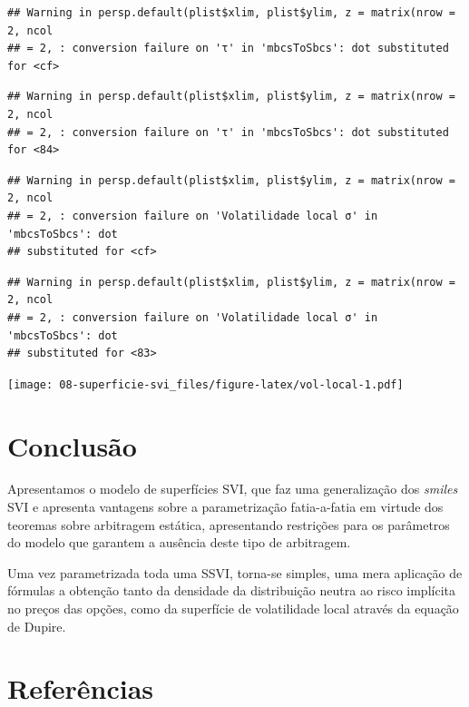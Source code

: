 \documentclass[]{book}
\theoremstyle{definition}
\theoremstyle{definition}
\theoremstyle{definition}
\theoremstyle{remark}
\begin{document}
\begin{verbatim}
## Warning in persp.default(plist$xlim, plist$ylim, z = matrix(nrow = 2, ncol
## = 2, : conversion failure on 'τ' in 'mbcsToSbcs': dot substituted for <cf>
\end{verbatim}

\begin{verbatim}
## Warning in persp.default(plist$xlim, plist$ylim, z = matrix(nrow = 2, ncol
## = 2, : conversion failure on 'τ' in 'mbcsToSbcs': dot substituted for <84>
\end{verbatim}

\begin{verbatim}
## Warning in persp.default(plist$xlim, plist$ylim, z = matrix(nrow = 2, ncol
## = 2, : conversion failure on 'Volatilidade local σ' in 'mbcsToSbcs': dot
## substituted for <cf>
\end{verbatim}

\begin{verbatim}
## Warning in persp.default(plist$xlim, plist$ylim, z = matrix(nrow = 2, ncol
## = 2, : conversion failure on 'Volatilidade local σ' in 'mbcsToSbcs': dot
## substituted for <83>
\end{verbatim}

\texttt{[image: 08-superficie-svi\_files/figure-latex/vol-local-1.pdf]}

\section{Conclusão}\label{conclusao-4}

Apresentamos o modelo de superfícies SVI, que faz uma generalização dos
\emph{smiles} SVI e apresenta vantagens sobre a parametrização
fatia-a-fatia em virtude dos teoremas sobre arbitragem estática,
apresentando restrições para os parâmetros do modelo que garantem a
ausência deste tipo de arbitragem.

Uma vez parametrizada toda uma SSVI, torna-se simples, uma mera
aplicação de fórmulas a obtenção tanto da densidade da distribuição
neutra ao risco implícita no preços das opções, como da superfície de
volatilidade local através da equação de Dupire.

\section{Referências}\label{referencias-1}


\end{document}

